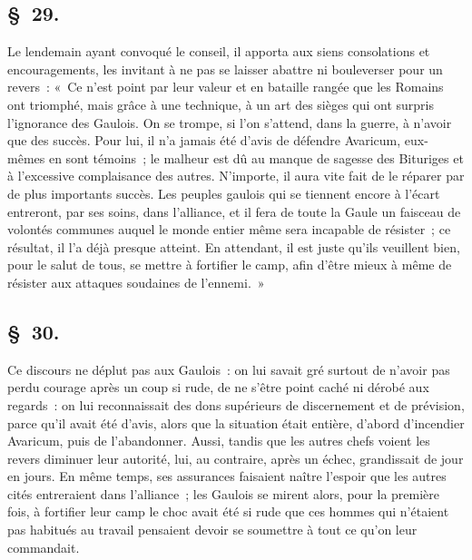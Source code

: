 \documentclass[french,twoside]{book} %
\begin{document}
\subsection[{§ 29.}]{ \textsc{§ 29.} }
\noindent Le lendemain ayant convoqué le conseil, il apporta aux siens consolations et encouragements, les invitant à ne pas se laisser abattre ni bouleverser pour un revers : « Ce n’est point par leur valeur et en bataille rangée que les Romains ont triomphé, mais grâce à une technique, à un art des sièges qui ont surpris l’ignorance des Gaulois. On se trompe, si l’on s’attend, dans la guerre, à n’avoir que des succès. Pour lui, il n’a jamais été d’avis de défendre Avaricum, eux-mêmes en sont témoins ; le malheur est dû au manque de sagesse des Bituriges et à l’excessive complaisance des autres. N'importe, il aura vite fait de le réparer par de plus importants succès. Les peuples gaulois qui se tiennent encore à l’écart entreront, par ses soins, dans l’alliance, et il fera de toute la Gaule un faisceau de volontés communes auquel le monde entier même sera incapable de résister ; ce résultat, il l’a déjà presque atteint. En attendant, il est juste qu’ils veuillent bien, pour le salut de tous, se mettre à fortifier le camp, afin d’être mieux à même de résister aux attaques soudaines de l’ennemi. »
\subsection[{§ 30.}]{ \textsc{§ 30.} }
\noindent Ce discours ne déplut pas aux Gaulois : on lui savait gré surtout de n’avoir pas perdu courage après un coup si rude, de ne s’être point caché ni dérobé aux regards : on lui reconnaissait des dons supérieurs de discernement et de prévision, parce qu’il avait été d’avis, alors que la situation était entière, d’abord d’incendier Avaricum, puis de l’abandonner. Aussi, tandis que les autres chefs voient les revers diminuer leur autorité, lui, au contraire, après un échec, grandissait de jour en jours. En même temps, ses assurances faisaient naître l’espoir que les autres cités entreraient dans l’alliance ; les Gaulois se mirent alors, pour la première fois, à fortifier leur camp le choc avait été si rude que ces hommes qui n’étaient pas habitués au travail pensaient devoir se soumettre à tout ce qu’on leur commandait.
\end{document}
